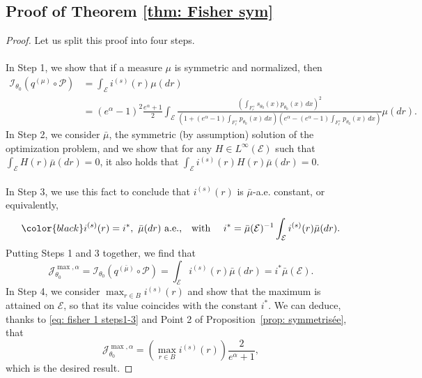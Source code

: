 \documentclass[a4paper, 11pt]{article}
\theoremstyle{definition}
\newcommand{\modar}{\color{black}}
\begin{document}
{\subsection{Proof of Theorem \ref{thm: Fisher sym}}
\begin{proof}
Let us split this proof into four steps. \\
\\
 In Step 1, we show that if a measure $\mu$ is symmetric and normalized, then 
\begin{align*}
\mathcal{I}_{\theta_0}(q^{(\mu)} \circ \mathcal{P}) &= \int_{\mathcal{E}} i^{(s)} (r) \mu(dr) \\
& = (e^\alpha - 1)^2\frac{e^\alpha + 1}{2} \int_\mathcal{E} \frac{\left(\int_{F_r^+} s_{\theta_0}(x) p_{\theta_0}(x) \, dx\right)^2}{\left(1 + (e^\alpha - 1)\int_{F_r^+} p_{\theta_0}(x) \, dx\right) \left(e^\alpha - (e^\alpha - 1) \int_{F_r^+} p_{\theta_0}(x) \, dx\right)} \mu(dr).
\end{align*}
 In Step 2, we consider $\bar{\mu}$, the symmetric (by assumption) solution of the optimization problem, and we show that for any $H \in L^\infty(\mathcal{E})$ such that $\int_\mathcal{E} H(r) \bar{\mu}(dr) = 0$, it also holds that $\int_\mathcal{E} i^{(s)}(r) H(r) \bar{\mu}(dr) = 0$.\\
\\
In Step 3, we use this fact to conclude that $i^{(s)}(r)$ is $\bar{\mu}$-a.e. constant, or equivalently,
  \[
{\modar i^{(s)}(r)=i^*,~\bar{\mu}(dr) \text{ a.e.,\quad with \quad} {i^*}=\bar{\mu}(\mathcal{E})^{-1}\int_\mathcal{E} i^{(s)}(r) \bar{\mu}(dr).}
  \] 
  Putting Steps 1 and 3 together, we find that
  \begin{equation}\label{eq: fisher 1 steps1-3}
    \mathcal{J}_{\theta_0}^{\max, \alpha} = \mathcal{I}_{\theta_0}(q^{(\bar{\mu})} \circ \mathcal{P}) = \int_{\mathcal{E}} i^{(s)}(r) \bar{\mu}(dr) = i^* \bar{\mu}(\mathcal{E}).
  \end{equation}
 In Step 4, we consider $\max_{r \in B} i^{(s)}(r)$ and show that the maximum is attained on $\mathcal{E}$, so that its value coincides with the constant $i^*$. We can deduce, thanks to \eqref{eq: fisher 1 steps1-3} and Point 2 of Proposition~\ref{prop: symmetrisée}, that
  \[
  \mathcal{J}_{\theta_0}^{\max, \alpha} = \left( \max_{r \in B} i^{(s)}(r) \right) \frac{2}{e^\alpha + 1},
  \]
  which is the desired result.

\medskip


\end{proof}}
\end{document}

